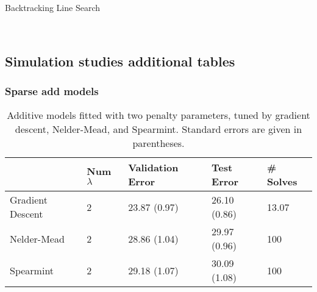\documentclass[12pt,letterpaper]{article}
\begin{document}
\begin{algorithm}
\caption{Backtracking Line Search}
\label{alg:backtracking}
         \begin{algorithmic}
  	 \\
	\ENDWHILE
	\end{algorithmic}
\end{algorithm}

\subsection{Simulation studies additional tables}

\subsubsection{Sparse add models}

\begin{table}
	\caption {\label{tab:additive} Additive models fitted with two penalty parameters, tuned by gradient descent, Nelder-Mead, and Spearmint. Standard errors are given in parentheses.}
	\centering
	\begin{tabular}{| l | l | l | l | l | }
		\hline
		& Num $\lambda$ & Validation Error & Test Error & \# Solves\\
		\hline
		Gradient Descent & 2 & 23.87 (0.97) & 26.10 (0.86) & 13.07 \\
		\hline
		Nelder-Mead & 2 & 28.86 (1.04) & 29.97 (0.96) & 100 \\
		\hline
		Spearmint & 2 & 29.18 (1.07) & 30.09 (1.08) & 100 \\
		\hline
	\end{tabular}
\end{table}
\end{document}
